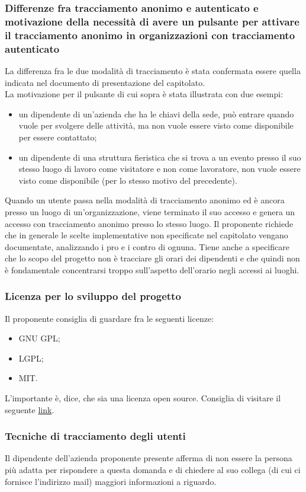 \subsubsection*{Differenze fra tracciamento anonimo e autenticato e motivazione della necessità di avere un pulsante per attivare il tracciamento anonimo in organizzazioni con tracciamento autenticato}
La differenza fra le due modalità di tracciamento è stata confermata essere quella indicata nel documento di presentazione del capitolato.\\
La motivazione per il pulsante di cui sopra è stata illustrata con due esempi:
\begin{itemize}
	\item un dipendente di un'azienda che ha le chiavi della sede, può entrare quando vuole per svolgere delle attività, ma non vuole essere visto come disponibile per essere contattato;
	\item un dipendente di una struttura fieristica che si trova a un evento presso il suo stesso luogo di lavoro come visitatore e non come lavoratore, non vuole essere visto come disponibile (per lo stesso motivo del precedente).
\end{itemize}
Quando un utente passa nella modalità di tracciamento anonimo ed è ancora presso un luogo di un'organizzazione, viene terminato il suo accesso e genera un accesso con tracciamento anonimo presso lo stesso luogo.
Il proponente richiede che in generale le scelte implementative non specificate nel capitolato vengano documentate, analizzando i pro e i contro di ognuna. Tiene anche a specificare che lo scopo del progetto non è
tracciare gli orari dei dipendenti e che quindi non è fondamentale concentrarsi troppo sull'aspetto dell'orario negli accessi ai luoghi.

\subsubsection*{Licenza per lo sviluppo del progetto}
Il proponente consiglia di guardare fra le seguenti licenze:
\begin{itemize}
	\item GNU GPL;
	\item LGPL;
	\item MIT.
\end{itemize}
L'importante è, dice, che sia una licenza open source. Consiglia di visitare il seguente \href{https://opensource.org/licenses}{link}.

\subsubsection*{Tecniche di tracciamento degli utenti}
Il dipendente dell'azienda proponente presente afferma di non essere la persona più adatta per rispondere a questa domanda e di chiedere al suo collega (di cui ci fornisce l'indirizzo mail) maggiori informazioni a riguardo.

